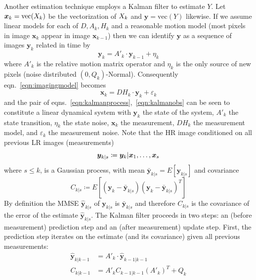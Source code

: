 Another estimation technique employs a Kalman filter \cite{elad1999} to estimate \(Y\).
%
Let \(\bm{x}_k = \text{vec}(X_k)\) be the vectorization of \(X_k\) and \(\bm{y} = \text{vec}(Y)\) likewise.
%
If we assume linear models for each of \(D, A_k, H_k\) and a reasonable motion model (most pixels in image \(\bm{x}_k\) appear in image \(\bm{x}_{k-1}\)) then we can identify \(\bm{y}\) as a sequence of images \(\bm{y}_k\) related in time by
\begin{equation}
    \bm{y}_k = A'_k \cdot \bm{y}_{k-1} + \eta_k
    \label{eqn:kalmanprocess}
\end{equation}
%
where \(A'_k\) is the relative motion matrix operator and \(\eta_k\) is the only source of new pixels (noise distributed \((0, Q_k)\)-Normal).
%
Consequently eqn.~\eqref{eqn:imagingmodel} becomes
\begin{equation}
    \bm{x}_k = DH_k \cdot \bm{y}_k + \varepsilon_k
    \label{eqn:kalmanobs}
\end{equation}
and the pair of eqns.~\eqref{eqn:kalmanprocess},~\eqref{eqn:kalmanobs} can be seen to constitute a linear dynamical system with \(\bm{y}_k\) the state of the system, \(A'_k\) the state transition, \(\eta_k\) the state noise, \(\bm{x}_k\) the measurement, \(DH_k\) the measurement model, and \(\varepsilon_k\) the measurement noise.
%
Note that the HR image conditioned on all previous LR images (measurements)
\begin{equation}
    \bm{y}_{k|s} \coloneqq \bm{y}_k|\bm{x}_1, \mathellipsis, \bm{x}_s
\end{equation}
where \(s \leq k\), is a Gaussian process, with mean \(\bar{\bm{y}}_{k|s} = E\left[\bm{y}_{k|s}\right]\)
and covariance
\begin{equation}
    C_{k|s} \coloneqq E\left[ (\bm{y}_k - \bar{\bm{y}}_{k|s})(\bm{y}_k - \bar{\bm{y}}_{k|s})^T  \right]
\end{equation}
%
By definition the MMSE \(\hat{\bm{y}}_{k|s}\) of \(\bm{y}_{k|s}\) is \(\bar{\bm{y}}_{k|s}\) and therefore \(C_{k|s}\) is the covariance of the error of the estimate \(\hat{\bm{y}}_{k|s}\).
%
The Kalman filter proceeds in two steps: an  (before measurement) prediction step and an  (after measurement) update step.
%
First, the prediction step iterates on the estimate (and its covariance) given all previous measurements:
\begin{align}
    \hat{\bm{y}}_{k|k-1} & = A'_k \cdot \hat{\bm{y}}_{k-1|k-1}     \\
    C_{k|k-1}            & = A'_k C_{k-1|k-1} (A'_k)^T + Q_k
\end{align}
